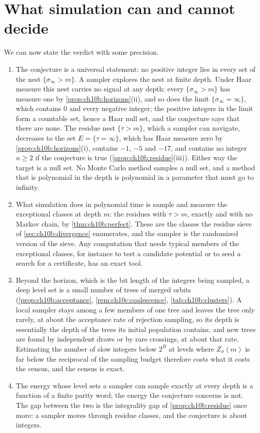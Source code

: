 \section{What simulation can and cannot decide}

We can now state the verdict with some precision.

\begin{enumerate}[label=(\roman*),leftmargin=2em]
\item The conjecture is a universal statement: no positive integer lies in every set of the nest $\{\sigma_\infty>m\}$. A sampler explores the nest at finite depth.
  Under Haar measure this nest carries no signal at any depth: every $\{\sigma_\infty>m\}$ has measure one by \cref{prop:ch10b:horizons}(ii), and so does the limit $\{\sigma_\infty=\infty\}$, which contains $0$ and every negative integer; the positive integers in the limit form a countable set, hence a Haar null set, and the conjecture says that there are none.
  The residue nest $\{\tau>m\}$, which a sampler can navigate, decreases to the set $E=\{\tau=\infty\}$, which has Haar measure zero by \cref{prop:ch10b:horizons}(i), contains $-1$, $-5$ and $-17$, and contains no integer $n\ge2$ if the conjecture is true (\cref{prop:ch10b:residue}(iii)). Either way the target is a null set.
  No Monte Carlo method
  samples a null set, and a method that is polynomial in the depth is
  polynomial in a parameter that must go to infinity.
\item What simulation does in polynomial time is sample and measure the
  exceptional classes at depth $m$: the residues with $\tau>m$, exactly and
  with no Markov chain, by \cref{thm:ch10b:perfect}. These are the classes the
  residue sieve of \cref{sec:ch10b:divergence} enumerates, and the sampler is
  the randomized version of the sieve. Any computation that needs typical
  members of the exceptional classes, for instance to test a candidate
  potential or to seed a search for a certificate, has an exact tool.
\item Beyond the horizon, which is the bit length of the integers being
  sampled, a deep level set is a small number of trees of merged orbits
  (\cref{prop:ch10b:acceptance}, \cref{rem:ch10c:coalescence}, \cref{tab:ch10b:clusters}). A local sampler
  stays among a few members of one tree and leaves the tree only rarely, at about the acceptance rate of rejection sampling, so its depth is essentially the depth of the trees
  its initial population contains, and new trees are found by independent draws or by rare crossings, at about that rate.
  Estimating the number of slow integers below $2^B$ at levels where $Z_\sigma(m)$ is far below the reciprocal of the sampling budget therefore costs what it costs the
  census, and the census is exact.
\item The energy whose level sets a sampler can sample exactly at every depth is a function of a
  finite parity word; the energy the conjecture concerns is not. The gap
  between the two is the integrality gap of \cref{prop:ch10b:residue} once
  more: a sampler moves through residue classes, and the conjecture is about
  integers.
\end{enumerate}

